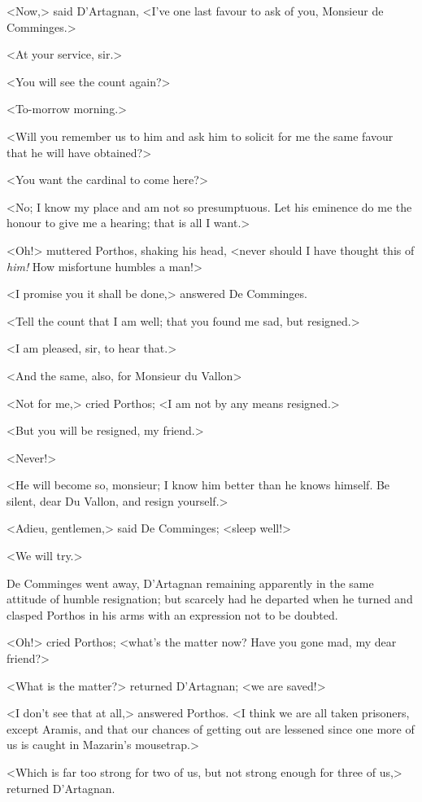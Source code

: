 <Now,> said D'Artagnan, <I've one last favour to ask of you, Monsieur de Comminges.>

<At your service, sir.>

<You will see the count again?>

<To-morrow morning.>

<Will you remember us to him and ask him to solicit for me the same favour that he will have obtained?>

<You want the cardinal to come here?>

<No; I know my place and am not so presumptuous. Let his eminence do me the honour to give me a hearing; that is all I want.>

<Oh!> muttered Porthos, shaking his head, <never should I have thought this of \textit{him!} How misfortune humbles a man!>

<I promise you it shall be done,> answered De Comminges.

<Tell the count that I am well; that you found me sad, but resigned.>

<I am pleased, sir, to hear that.>

<And the same, also, for Monsieur du Vallon\longdash>

<Not for me,> cried Porthos; <I am not by any means resigned.>

<But you will be resigned, my friend.>

<Never!>

<He will become so, monsieur; I know him better than he knows himself. Be silent, dear Du Vallon, and resign yourself.>

<Adieu, gentlemen,> said De Comminges; <sleep well!>

<We will try.>

De Comminges went away, D'Artagnan remaining apparently in the same attitude of humble resignation; but scarcely had he departed when he turned and clasped Porthos in his arms with an expression not to be doubted.

<Oh!> cried Porthos; <what's the matter now? Have you gone mad, my dear friend?>

<What is the matter?> returned D'Artagnan; <we are saved!>

<I don't see that at all,> answered Porthos. <I think we are all taken prisoners, except Aramis, and that our chances of getting out are lessened since one more of us is caught in Mazarin's mousetrap.>

<Which is far too strong for two of us, but not strong enough for three of us,> returned D'Artagnan.

